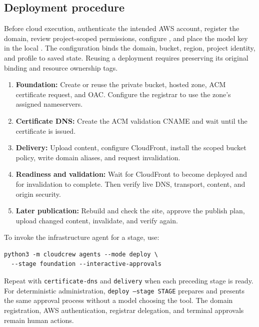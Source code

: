\documentclass[11pt]{article}
\begin{document}
\subsection{Deployment procedure}
Before cloud execution, authenticate the intended AWS account, register the domain, review project-scoped permissions, configure , and place the model key in the local . The configuration binds the domain, bucket, region, project identity, and profile to saved state. Reusing a deployment requires preserving its original binding and resource ownership tags.
\begin{enumerate}
  \item \textbf{Foundation:} Create or reuse the private bucket, hosted zone, ACM certificate request, and OAC. Configure the registrar to use the zone's assigned nameservers.
  \item \textbf{Certificate DNS:} Create the ACM validation CNAME and wait until the certificate is issued.
  \item \textbf{Delivery:} Upload content, configure CloudFront, install the scoped bucket policy, write domain aliases, and request invalidation.
  \item \textbf{Readiness and validation:} Wait for CloudFront to become deployed and for invalidation to complete. Then verify live DNS, transport, content, and origin security.
  \item \textbf{Later publication:} Rebuild and check the site, approve the publish plan, upload changed content, invalidate, and verify again.
\end{enumerate}
To invoke the infrastructure agent for a stage, use:
\begin{lstlisting}
python3 -m cloudcrew agents --mode deploy \
  --stage foundation --interactive-approvals
\end{lstlisting}
Repeat with \texttt{certificate-dns} and \texttt{delivery} when each preceding stage is ready. For deterministic administration, \texttt{deploy --stage STAGE} prepares and presents the same approval process without a model choosing the tool. The domain registration, AWS authentication, registrar delegation, and terminal approvals remain human actions.
\end{document}
